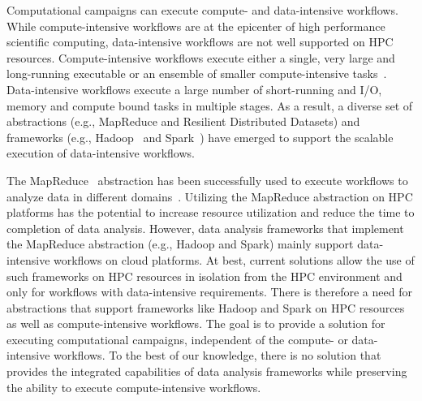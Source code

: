 Computational campaigns can execute compute- and data-intensive workflows. While
compute-intensive workflows are at the epicenter of high performance scientific
computing, data-intensive workflows are not well supported on HPC resources.
Compute-intensive workflows execute either a single, very large and long-running
executable or an ensemble of smaller compute-intensive
tasks~\cite{balasubramanian2018harnessing}. Data-intensive workflows execute a
large number of short-running and I/O, memory and compute bound tasks in
multiple stages. As a result, a diverse set of abstractions (e.g., MapReduce and
Resilient Distributed Datasets) and frameworks (e.g., Hadoop~\cite{hadoop} and
Spark~\cite{zaharia2010spark}) have emerged to support the scalable execution of
data-intensive workflows.



The MapReduce~\cite{dean2004mapreduce} abstraction has been successfully used to
execute workflows to analyze data in different
domains~\cite{hellerstein2012science}. Utilizing the MapReduce abstraction on
HPC platforms has the potential to increase resource utilization and reduce the
time to completion of data analysis. However, data analysis frameworks that
implement the MapReduce abstraction (e.g., Hadoop and Spark) mainly support
data-intensive workflows on cloud platforms. At best, current solutions allow
the use of such frameworks on HPC resources in isolation from the HPC
environment and only for workflows with data-intensive requirements. There is
therefore a need for abstractions that support frameworks like Hadoop and Spark
on HPC resources as well as compute-intensive workflows. The goal is to provide
a solution for executing computational campaigns, independent of the compute- or
data-intensive workflows. To the best of our knowledge, there is no solution
that provides the integrated capabilities of data analysis frameworks while
preserving the ability to execute compute-intensive workflows.

